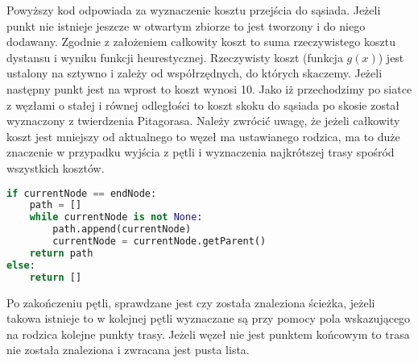 Powyższy kod odpowiada za wyznaczenie kosztu przejścia do sąsiada. Jeżeli punkt nie istnieje jeszcze w otwartym zbiorze 
to jest tworzony i do niego dodawany. Zgodnie z założeniem całkowity koszt to suma rzeczywistego kosztu dystansu i wyniku funkcji heurestycznej. 
Rzeczywisty koszt (funkcja $g(x)$) jest ustalony na sztywno i zależy od współrzędnych, do których skaczemy. 
Jeżeli następny punkt jest na wprost to koszt wynosi 10.
Jako iż przechodzimy po siatce z węzłami o stałej i równej odległości to koszt skoku do sąsiada po skosie został wyznaczony z twierdzenia Pitagorasa. 
Należy zwrócić uwagę, że jeżeli całkowity koszt jest mniejszy od aktualnego to węzeł ma ustawianego rodzica, ma to duże znaczenie w przypadku wyjścia z pętli 
i wyznaczenia najkrótszej trasy spośród wszystkich kosztów. 

\begin{lstlisting}[language=Python,caption=Przygotowanie danych,label={kodPython3}]
if currentNode == endNode:
    path = []
    while currentNode is not None:
        path.append(currentNode)
        currentNode = currentNode.getParent()
    return path
else:
    return []
\end{lstlisting}

Po zakończeniu pętli, sprawdzane jest czy została znaleziona ścieżka, jeżeli takowa istnieje to w kolejnej pętli 
wyznaczane są przy pomocy pola wskazującego na rodzica kolejne punkty trasy. 
Jeżeli węzeł nie jest punktem końcowym to trasa nie została znaleziona i zwracana jest pusta lista.